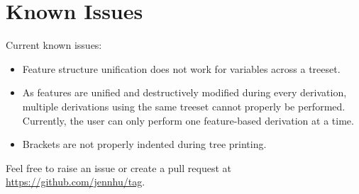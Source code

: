\documentclass[10.5pt]{article}
\begin{document}
\section{Known Issues}
Current known issues:

\begin{itemize}
	\item Feature structure unification does not work for variables across a treeset.
	\item As features are unified and destructively modified during every derivation, multiple derivations using the same treeset cannot properly be performed. Currently, the user can only perform one feature-based derivation at a time.
  \item Brackets are not properly indented during tree printing.
\end{itemize}

Feel free to raise an issue or create a pull request at \url{https://github.com/jennhu/tag}.
\end{document}
